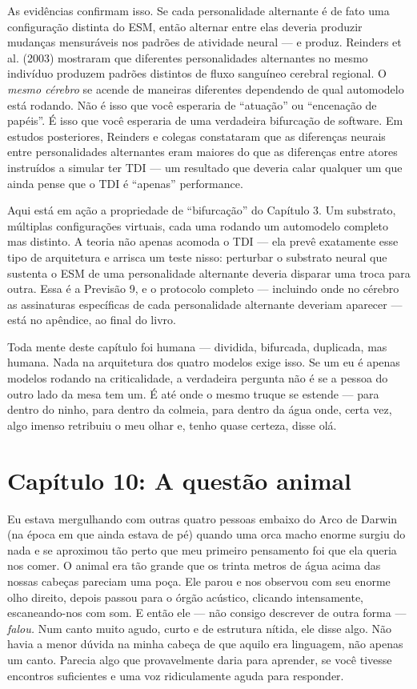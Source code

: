 \documentclass[11pt, twoside, openright]{book}
\begin{document}
As evidências confirmam isso. Se cada personalidade alternante é de fato uma configuração distinta do ESM, então alternar entre elas deveria produzir mudanças mensuráveis nos padrões de atividade neural --- e produz. Reinders et al. (2003) mostraram que diferentes personalidades alternantes no mesmo indivíduo produzem padrões distintos de fluxo sanguíneo cerebral regional. O \textit{mesmo cérebro} se acende de maneiras diferentes dependendo de qual automodelo está rodando. Não é isso que você esperaria de ``atuação'' ou ``encenação de papéis''. É isso que você esperaria de uma verdadeira bifurcação de software. Em estudos posteriores, Reinders e colegas constataram que as diferenças neurais entre personalidades alternantes eram maiores do que as diferenças entre atores instruídos a simular ter TDI --- um resultado que deveria calar qualquer um que ainda pense que o TDI é ``apenas'' performance.

Aqui está em ação a propriedade de ``bifurcação'' do Capítulo 3. Um substrato, múltiplas configurações virtuais, cada uma rodando um automodelo completo mas distinto. A teoria não apenas acomoda o TDI --- ela prevê exatamente esse tipo de arquitetura e arrisca um teste nisso: perturbar o substrato neural que sustenta o ESM de uma personalidade alternante deveria disparar uma troca para outra. Essa é a Previsão 9, e o protocolo completo --- incluindo onde no cérebro as assinaturas específicas de cada personalidade alternante deveriam aparecer --- está no apêndice, ao final do livro.

Toda mente deste capítulo foi humana --- dividida, bifurcada, duplicada, mas humana. Nada na arquitetura dos quatro modelos exige isso. Se um eu é apenas modelos rodando na criticalidade, a verdadeira pergunta não é se a pessoa do outro lado da mesa tem um. É até onde o mesmo truque se estende --- para dentro do ninho, para dentro da colmeia, para dentro da água onde, certa vez, algo imenso retribuiu o meu olhar e, tenho quase certeza, disse olá.


\chapter*{Capítulo 10: A questão animal}

Eu estava mergulhando com outras quatro pessoas embaixo do Arco de Darwin (na época em que ainda estava de pé) quando uma orca macho enorme surgiu do nada e se aproximou tão perto que meu primeiro pensamento foi que ela queria nos comer. O animal era tão grande que os trinta metros de água acima das nossas cabeças pareciam uma poça. Ele parou e nos observou com seu enorme olho direito, depois passou para o órgão acústico, clicando intensamente, escaneando-nos com som. E então ele --- não consigo descrever de outra forma --- \textit{falou.} Num canto muito agudo, curto e de estrutura nítida, ele disse algo. Não havia a menor dúvida na minha cabeça de que aquilo era linguagem, não apenas um canto. Parecia algo que provavelmente daria para aprender, se você tivesse encontros suficientes e uma voz ridiculamente aguda para responder.
\end{document}
